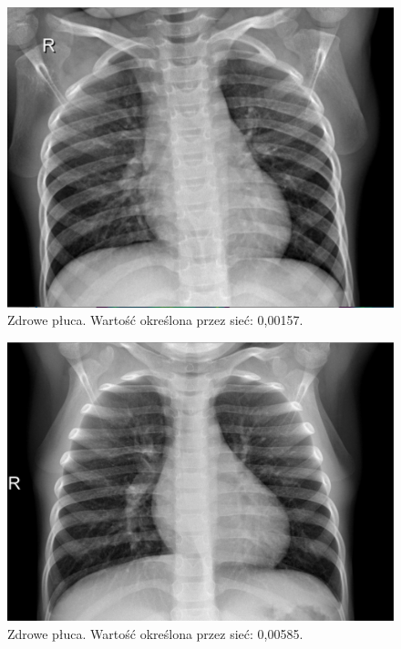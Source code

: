 \documentclass[12pt,a4paper,twoside,titlepage,openright]{book}
\begin{document}
\begin{itemize}
\begin{itemize}
\begin{figure}[ht]
	\centering
			\includegraphics[resolution=100, scale=0.3]{randomCertain1.png}
		\caption{Zdrowe płuca. Wartość określona przez sieć: 0,00157.}
				\label{fig:randomCertain1}
\end{figure}

\begin{figure}[ht]
	\centering
			\includegraphics[resolution=100, scale=0.3]{randomCertain2.png}
		\caption{Zdrowe płuca. Wartość określona przez sieć: 0,00585.}
				\label{fig:randomCertain2}
\end{figure}


\end{itemize}
\end{itemize}
\end{document}
